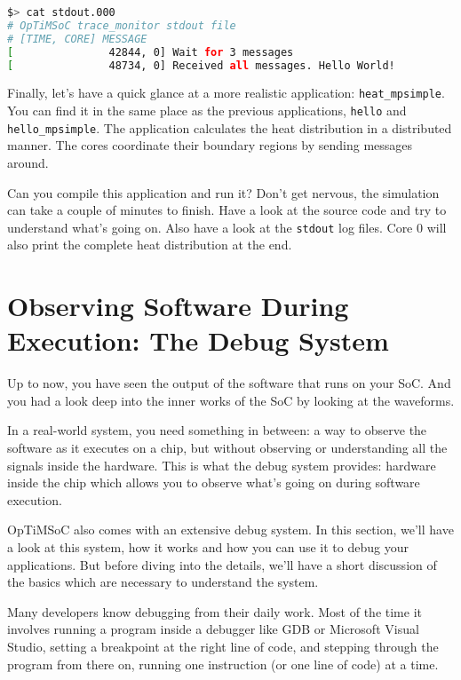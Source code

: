 \begin{lstlisting}[language=sh]
$> cat stdout.000
# OpTiMSoC trace_monitor stdout file
# [TIME, CORE] MESSAGE
[               42844, 0] Wait for 3 messages
[               48734, 0] Received all messages. Hello World!
\end{lstlisting}

\vspace{2em}

Finally, let's have a quick glance at a more realistic application:
\verb|heat_mpsimple|. You can find it in the same place as the previous
applications, \verb|hello| and \verb|hello_mpsimple|. The application
calculates the heat distribution in a distributed manner. The cores coordinate
their boundary regions by sending messages around.

Can you compile this application and run it? Don't get nervous, the simulation
can take a couple of minutes to finish. Have a look at the source code and try
to understand what's going on. Also have a look at the \verb|stdout| log files.
Core 0 will also print the complete heat distribution at the end.


\section{Observing Software During Execution: The Debug System}
\label{sec:tutorials:debug_system_intro}

Up to now, you have seen the output of the software that runs on your SoC.
And you had a look deep into the inner works of the SoC by looking at the waveforms.

In a real-world system, you need something in between: a way to observe the software as it executes on a chip, but without observing or understanding all the signals inside the hardware.
This is what the debug system provides: hardware inside the chip which allows you to observe what's going on during software execution.

OpTiMSoC also comes with an extensive debug system. In this section, we'll have
a look at this system, how it works and how you can use it to debug your
applications. But before diving into the details, we'll have a short discussion
of the basics which are necessary to understand the system.

Many developers know debugging from their daily work. Most of the time it
involves running a program inside a debugger like GDB or Microsoft Visual
Studio, setting a breakpoint at the right line of code, and stepping through the
program from there on, running one instruction (or one line of code) at a time.

